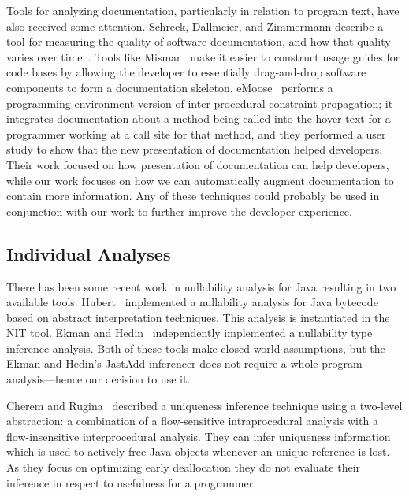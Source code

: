 Tools for analyzing documentation, particularly in relation to program text,
have also received some attention.  Schreck, Dallmeier, and Zimmermann describe
a tool for measuring the quality of software documentation, and how that
quality varies over time~\cite{evolvedoc}. Tools like Mismar~\cite{mismar} make
it easier to construct usage guides for code bases by allowing the developer to
essentially drag-and-drop software components to form a documentation skeleton.
eMoose~\cite{emoose} performs a programming-environment version of
inter-procedural constraint propagation; it integrates
documentation about a method being called into the hover text for a programmer
working at a call site for that method, and they performed a user study to show
that the new presentation of documentation helped developers.  Their work
focused on how presentation of documentation can help developers, while our work
focuses on how we can automatically augment documentation to contain more
information.  Any of these
techniques could probably be used
in conjunction with our work to further improve the developer experience.

\subsection{Individual Analyses}

There has been some recent work in nullability analysis for Java
resulting in two available tools.  Hubert~\cite{NIT} implemented a nullability
analysis for Java bytecode based on abstract interpretation techniques.  This
analysis is instantiated in the {\sc NIT} tool.  Ekman and
Hedin~\cite{NonNullTypeInference} independently implemented a nullability type
inference analysis.  Both of these tools make closed world assumptions, but the
Ekman and Hedin's JastAdd inferencer does not require a whole program
analysis---hence our decision to use it.


Cherem and Rugina~\cite{UniquenessInference} described a uniqueness inference
technique using a two-level abstraction: a combination of a flow-sensitive
intraprocedural analysis with a flow-insensitive interprocedural analysis. 
They can infer uniqueness information which is used to actively free Java
objects whenever an unique reference is lost. As they focus on optimizing 
early deallocation they do not evaluate their inference in respect to usefulness
for a programmer.

